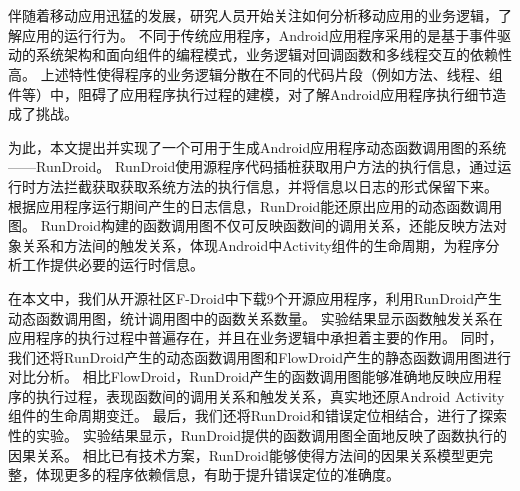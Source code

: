 
\chapter*{}


\setlength{\baselineskip}{25pt}	



伴随着移动应用迅猛的发展，研究人员开始关注如何分析移动应用的业务逻辑，了解应用的运行行为。
不同于传统应用程序，Android应用程序采用的是基于事件驱动的系统架构和面向组件的编程模式，业务逻辑对回调函数和多线程交互的依赖性高。
上述特性使得程序的业务逻辑分散在不同的代码片段（例如方法、线程、组件等）中，阻碍了应用程序执行过程的建模，对了解Android应用程序执行细节造成了挑战。



为此，本文提出并实现了一个可用于生成Android应用程序动态函数调用图的系统——RunDroid。
RunDroid使用源程序代码插桩获取用户方法的执行信息，通过运行时方法拦截获取获取系统方法的执行信息，并将信息以日志的形式保留下来。
根据应用程序运行期间产生的日志信息，RunDroid能还原出应用的动态函数调用图。
RunDroid构建的函数调用图不仅可反映函数间的调用关系，还能反映方法对象关系和方法间的触发关系，体现Android中Activity组件的生命周期，为程序分析工作提供必要的运行时信息。




在本文中，我们从开源社区F-Droid中下载9个开源应用程序，利用RunDroid产生动态函数调用图，统计调用图中的函数关系数量。
实验结果显示函数触发关系在应用程序的执行过程中普遍存在，并且在业务逻辑中承担着主要的作用。
同时，我们还将RunDroid产生的动态函数调用图和FlowDroid产生的静态函数调用图进行对比分析。
相比FlowDroid，RunDroid产生的函数调用图能够准确地反映应用程序的执行过程，表现函数间的调用关系和触发关系，真实地还原Android Activity组件的生命周期变迁。
最后，我们还将RunDroid和错误定位相结合，进行了探索性的实验。
实验结果显示，RunDroid提供的函数调用图全面地反映了函数执行的因果关系。
相比已有技术方案，RunDroid能够使得方法间的因果关系模型更完整，体现更多的程序依赖信息，有助于提升错误定位的准确度。

{}